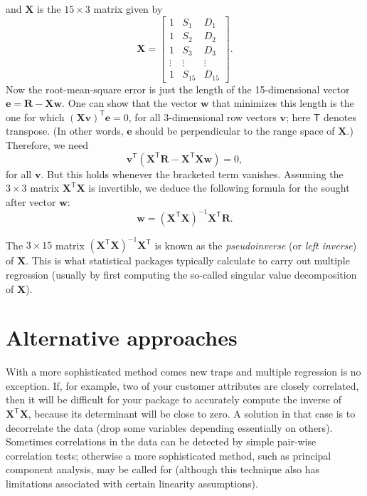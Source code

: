 \documentclass[11pt, reqno]{amsart} \usepackage{hyperlatex}
\begin{document}
and ${\mathbf X}$ is the $15\times 3$ matrix given by
\begin{equation*}
  \mathbf X =
  \begin{bmatrix}
    1 & S_1 & D_1 \\
1 & S_2 & D_2 \\
1 & S_3 & D_3 \\
\vdots & \vdots & \vdots \\
1 & S_{15} & D_{15}
  \end{bmatrix}.
\end{equation*}
Now the root-mean-square error is just the length of the
15-dimensional vector ${\mathbf e} = {\mathbf R} - {\mathbf X}
{\mathbf w}$. One can show that the vector $\mathbf w$ that minimizes
this length is the one for which $({\mathbf X}\mathbf v)^{\mathsf T}
{\mathbf e} = 0$, for all $3$-dimensional row vectors ${\mathbf v}$;
here ${\mathsf T}$ denotes transpose. (In other words, $\mathbf e$
should be perpendicular to the range space of $\mathbf X$.)
Therefore, we need
\begin{equation*}
  {\mathbf v}^{\mathsf T}({\mathbf X}^{\mathsf T} {\mathbf R} -
  {\mathbf X}^{\mathsf T} {\mathbf X} {\mathbf w})=0,
\end{equation*}
for all ${\mathbf v} $. But this holds whenever the bracketed term
vanishes. Assuming the $3 \times 3$ matrix ${\mathbf X}^{\mathsf T}
{\mathbf X} $ is invertible, we deduce the following formula for the
sought after vector ${\mathbf w}$:
\begin{equation}
  {\mathbf w} = ({\mathbf X}^{\mathsf T} {\mathbf X})^{-1}{\mathbf
    X}^{\mathsf T} {\mathbf R}.
\end{equation}

The $3\times 15$ matrix
$({\mathbf X}^{\mathsf T} {\mathbf X})^{-1}{\mathbf X}^{\mathsf T}$ is
known as the {\em pseudoinverse} (or {\em left inverse}) of
${\mathbf X}$. This is what statistical packages typically calculate
to carry out multiple regression (usually by first computing the
so-called singular value decomposition of ${\mathbf X}$).

\section*{Alternative approaches} With a more sophisticated method comes new
traps and multiple regression is no exception. If, for example, two of
your customer attributes are closely correlated, then it will be
difficult for your package to accurately compute the inverse of
${\mathbf X}^{\mathsf T}{\mathbf X}$, because its determinant will be
close to zero. A solution in that case is to decorrelate the data
(drop some variables depending essentially on others). Sometimes
correlations in the data can be detected by simple pair-wise
correlation tests; otherwise a more sophisticated method, such as
principal component analysis, may be called for (although this
technique also has limitations associated with certain linearity assumptions).
\end{document}
